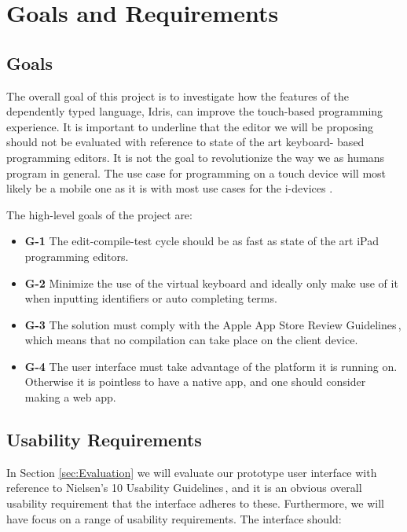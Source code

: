 \section{Goals and Requirements}
\label{sec:GoalsAndRequirements}

\subsection{Goals} The overall goal of this project is to investigate how the
features of the dependently typed language, Idris, can improve the touch-based
programming experience. It is important to underline that the editor we will be
proposing should not be evaluated with reference to state of the art keyboard-
based programming editors. It is not the goal to revolutionize the way we as
humans program in general. The use case for programming on a touch device will most likely be a
mobile one as it is with most use cases for the i-devices \cite[p. 26]{nielsen2013mobile}.

The high-level goals of the project are:

\begin{itemize} 
	\item \textbf{G-1} The edit-compile-test cycle should be as fast as state of the art iPad 
	programming editors.
	\item \textbf{G-2} Minimize the use of the virtual keyboard\cite[pp. 76]{nielsen2013mobile} and
	ideally only make use of it when inputting identifiers or auto completing terms.
	\item \textbf{G-3} The solution must comply with the Apple App Store Review 
	Guidelines\,\cite{AppStoreGuidelines}, which means that no compilation can take place on 
	the client device.
	\item \textbf{G-4} The user interface must take advantage of the platform it is running on. 
	Otherwise it is pointless to have a native app, and one should consider making a web app.
\end{itemize}

\subsection{Usability Requirements} 
In Section \ref{sec:Evaluation} we will evaluate our prototype user interface with reference to Nielsen's 10 Usability
Guidelines\,\cite{nielsen1990heuristic}, and it is an obvious overall usability
requirement that the interface adheres to these. Furthermore, we will have focus on a range of
usability requirements. The interface should:

